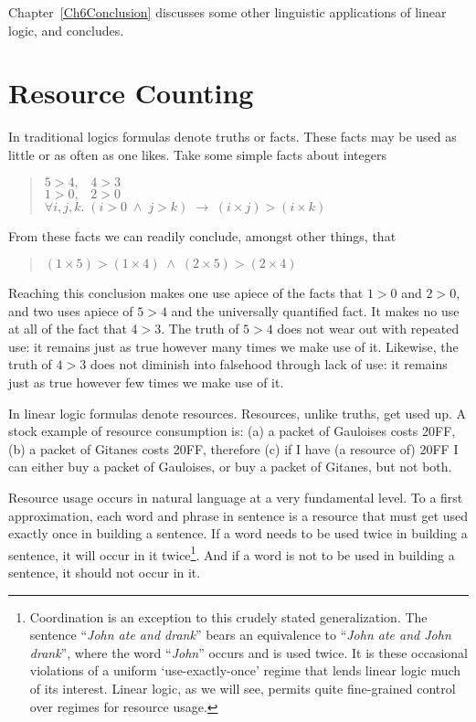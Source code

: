 Chapter~\ref{Ch6Conclusion} discusses some other linguistic
applications of linear logic, and concludes.
\fi

\section{Resource Counting}

In traditional logics 
formulas denote truths or facts.  These facts may be used as little or
as often as one likes.  Take some simple facts about integers
\begin{quote}
$5>4, \;\;\; 4>3$\\
$1>0, \;\;\; 2>0$\\
$\forall i,j,k.\; (i>0 \;\wedge\; j>k) \;\rightarrow \;
          (i\times j)>(i\times k)$
\end{quote}
From these facts we can readily conclude, amongst other things, that
\begin{quote}
$(1\times 5)>(1\times 4) \;\wedge\; (2\times 5)>(2\times 4)$
\end{quote}
Reaching this conclusion makes one use apiece of the facts that $1>0$ and 
$2>0$, and two uses apiece of $5>4$ and the universally quantified fact.
It makes no use at all of the fact that $4>3$.  The truth of $5>4$ does
not wear out with repeated use: it remains just as true however many times
we make use of it.  Likewise, the truth of $4>3$ does not diminish into
falsehood through lack of use: it remains just as true however
few times we make use of it.

\bigskip

In linear logic formulas denote resources.  Resources, unlike truths,
get used up.  A stock example of resource consumption is: (a) a packet
of Gauloises costs 20FF, (b) a packet of Gitanes costs 20FF, therefore
(c) if I have (a resource of) 20FF I can either buy a packet of
Gauloises, or buy a packet of Gitanes, but not both.

Resource usage occurs in natural language at a very fundamental
level.  To a first approximation, each word and phrase in sentence is 
a resource that must get used exactly once in building a sentence.  If
a word needs to be used twice in building a sentence, it will occur in it
twice\footnote{Coordination is an exception to this crudely stated
generalization. The sentence ``{\em John ate and drank}'' bears an
equivalence to ``{\em John ate and John drank}'', where the word
``{\em John}'' occurs and is used twice.  It is these
occasional violations of a uniform `use-exactly-once' regime that 
lends linear logic much of its interest.  Linear logic, as we will see,
permits quite fine-grained control over regimes for resource usage.}.
And if a word is not to be used in building a sentence, it should not
occur in it.

